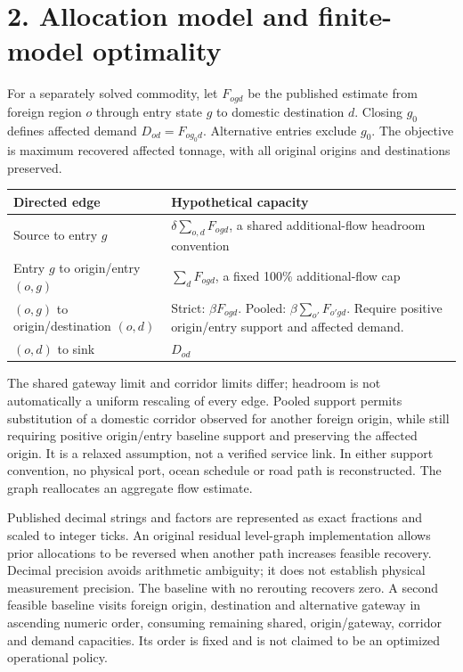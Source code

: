 \documentclass[11pt]{article}
\begin{document}
\newpage
\section*{2. Allocation model and finite-model optimality}
For a separately solved commodity, let $F_{ogd}$ be the published estimate from foreign region $o$ through entry state $g$ to domestic destination $d$. Closing $g_0$ defines affected demand $D_{od}=F_{og_0d}$. Alternative entries exclude $g_0$. The objective is maximum recovered affected tonnage, with all original origins and destinations preserved.

\begin{center}\small
\begin{tabular}{p{.31\linewidth}p{.60\linewidth}}\toprule
Directed edge & Hypothetical capacity\\\midrule
Source to entry $g$ & $\delta\sum_{o,d}F_{ogd}$, a shared additional-flow headroom convention\\
Entry $g$ to origin/entry $(o,g)$ & $\sum_d F_{ogd}$, a fixed 100\% additional-flow cap\\
$(o,g)$ to origin/destination $(o,d)$ & Strict: $\beta F_{ogd}$. Pooled: $\beta\sum_{o'}F_{o'gd}$. Require positive origin/entry support and affected demand.\\
$(o,d)$ to sink & $D_{od}$\\\bottomrule
\end{tabular}\end{center}

The shared gateway limit and corridor limits differ; headroom is not automatically a uniform rescaling of every edge. Pooled support permits substitution of a domestic corridor observed for another foreign origin, while still requiring positive origin/entry baseline support and preserving the affected origin. It is a relaxed assumption, not a verified service link. In either support convention, no physical port, ocean schedule or road path is reconstructed. The graph reallocates an aggregate flow estimate.

Published decimal strings and factors are represented as exact fractions and scaled to integer ticks. An original residual level-graph implementation allows prior allocations to be reversed when another path increases feasible recovery. Decimal precision avoids arithmetic ambiguity; it does not establish physical measurement precision. The baseline with no rerouting recovers zero. A second feasible baseline visits foreign origin, destination and alternative gateway in ascending numeric order, consuming remaining shared, origin/gateway, corridor and demand capacities. Its order is fixed and is not claimed to be an optimized operational policy.
\end{document}
